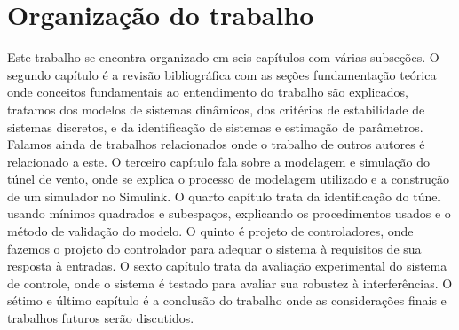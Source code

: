 \section{Organização do trabalho}


Este trabalho se encontra organizado em seis capítulos com várias subseções. O segundo capítulo é a revisão bibliográfica com as seções fundamentação teórica onde conceitos fundamentais ao entendimento do trabalho são explicados, tratamos dos modelos de sistemas dinâmicos, dos critérios de estabilidade de sistemas discretos, e da identificação de sistemas e estimação de parâmetros. Falamos ainda de trabalhos relacionados onde o trabalho de outros autores é relacionado a este. O terceiro capítulo fala sobre a modelagem e simulação do túnel de vento, onde se explica o processo de modelagem utilizado e a construção de um simulador no Simulink. O quarto capítulo trata da identificação do túnel usando mínimos quadrados e subespaços, explicando os procedimentos usados e o método de validação do modelo. O quinto é projeto de controladores, onde fazemos o projeto do controlador para adequar o sistema à requisitos de sua resposta à entradas. O sexto capítulo trata da avaliação experimental do sistema de controle, onde o sistema é testado para avaliar sua robustez à interferências. O sétimo e último capítulo é a conclusão do trabalho onde as considerações finais e trabalhos futuros serão discutidos.

